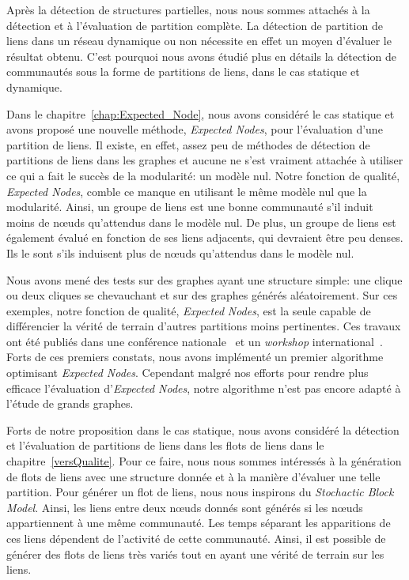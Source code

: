 Après la détection de structures partielles, nous nous sommes attachés à la détection et à l'évaluation de partition complète.
La détection de partition de liens dans un réseau dynamique ou non nécessite en effet un moyen d'évaluer le résultat obtenu.
C'est pourquoi nous avons étudié plus en détails la détection de communautés sous la forme de partitions de liens, dans le cas statique et dynamique.


Dans le chapitre~\ref{chap:Expected_Node},  nous avons considéré le cas statique et avons proposé une nouvelle méthode, \emph{Expected Nodes}, pour l'évaluation d'une partition de liens.
Il existe, en effet, assez peu de méthodes de détection de partitions de liens dans les graphes et aucune ne s'est vraiment attachée à utiliser ce qui a fait le succès de la modularité: un modèle nul.
Notre fonction de qualité, \emph{Expected Nodes}, comble ce manque en utilisant le même modèle nul que la modularité.
Ainsi, un groupe de liens est une bonne communauté s'il induit moins de n\oe{}uds qu'attendus dans le modèle nul.
De plus, un groupe de liens est également évalué en fonction de ses liens adjacents, qui devraient être peu denses.
Ils le sont s'ils induisent plus de n\oe{}uds qu'attendus dans le modèle nul.

Nous avons mené des tests sur des graphes ayant une structure simple: une clique ou deux cliques se chevauchant et sur des graphes générés aléatoirement.
Sur ces exemples, notre fonction de qualité, \emph{Expected} \emph{Nodes}, est la seule capable de différencier la vérité de terrain d'autres partitions moins pertinentes.
Ces travaux ont été publiés dans une conférence nationale~\cite{Gaumont2014} et un \emph{workshop} international~\cite{Gaumont2015}.
Forts de ces premiers constats, nous avons implémenté un premier algorithme optimisant \emph{Expected Nodes}.
Cependant malgré nos efforts pour rendre plus efficace l'évaluation d'\emph{Expected Nodes}, notre algorithme n'est pas encore adapté à l'étude de grands graphes.

\bigskip

Forts de notre proposition dans le cas statique, nous avons considéré la détection et l'évaluation de partitions de liens dans les flots de liens dans le chapitre~\ref{versQualite}.
Pour ce faire, nous nous sommes intéressés à la génération de flots de liens avec une structure donnée et à la manière d'évaluer une telle partition.
Pour générer un flot de liens, nous nous inspirons du \emph{Stochactic Block Model}.
Ainsi, les liens entre deux n\oe{}uds donnés sont générés  si les n\oe{}uds appartiennent à une même communauté.
Les temps séparant les apparitions de ces liens dépendent de l'activité de cette communauté.
Ainsi, il est possible de générer des flots de liens très variés tout en ayant une vérité de terrain sur les liens.

